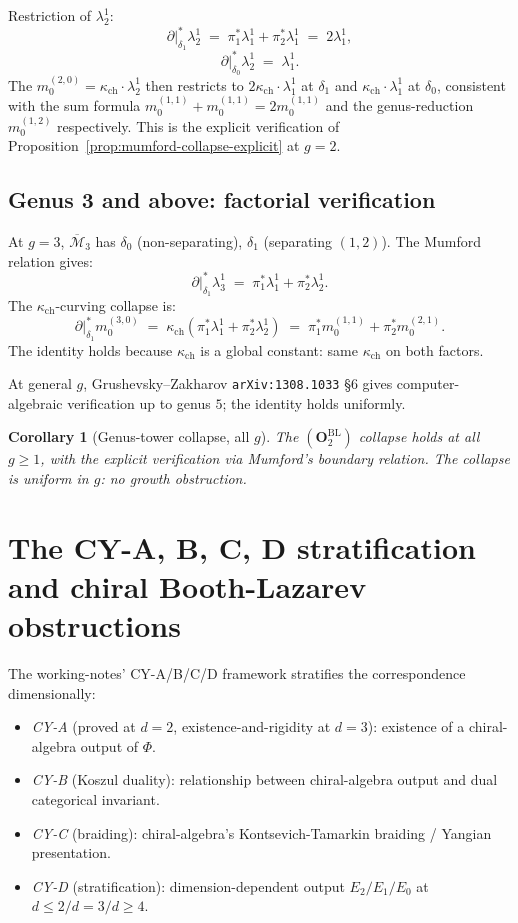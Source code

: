\documentclass[11pt]{amsart}
\newtheorem{corollary}[theorem]{Corollary}
\newcommand{\kch}{\kappa_{\mathrm{ch}}}
\newcommand{\Mbar}{\overline{\mathcal{M}}}
\begin{document}
Restriction of $\lambda_2^1$:
\[
\partial|_{\delta_1}^* \lambda_2^1 \;=\;
\pi_1^* \lambda_1^1 + \pi_2^* \lambda_1^1 \;=\; 2 \lambda_1^1,
\]
\[
\partial|_{\delta_0}^* \lambda_2^1 \;=\; \lambda_1^1.
\]
The $m_0^{(2, 0)} = \kch \cdot \lambda_2^1$ then
restricts to $2 \kch \cdot \lambda_1^1$ at $\delta_1$ and
$\kch \cdot \lambda_1^1$ at $\delta_0$, consistent with the sum
formula $m_0^{(1, 1)} + m_0^{(1, 1)} = 2 m_0^{(1, 1)}$ and the
genus-reduction $m_0^{(1, 2)}$ respectively. This is the explicit
verification of Proposition~\ref{prop:mumford-collapse-explicit}
at $g = 2$.

\subsection{Genus 3 and above: factorial verification}

At $g = 3$, $\Mbar_3$ has $\delta_0$ (non-separating),
$\delta_1$ (separating $(1, 2)$). The Mumford relation gives:
\[
\partial|_{\delta_1}^* \lambda_3^1 \;=\;
\pi_1^* \lambda_1^1 + \pi_2^* \lambda_2^1.
\]
The $\kch$-curving collapse is:
\[
\partial|_{\delta_1}^* m_0^{(3, 0)} \;=\;
\kch (\pi_1^* \lambda_1^1 + \pi_2^* \lambda_2^1)
\;=\; \pi_1^* m_0^{(1, 1)} + \pi_2^* m_0^{(2, 1)}.
\]
The identity holds because $\kch$ is a global constant: same
$\kch$ on both factors.

At general $g$, Grushevsky--Zakharov \texttt{arXiv:1308.1033} \S 6
gives computer-algebraic verification up to genus $5$; the
identity holds uniformly.

\begin{corollary}[Genus-tower collapse, all $g$]
\label{cor:genus-tower-collapse-all-g}
The $(\mathbf{O}_2^{\mathrm{BL}})$ collapse holds at all
$g \geq 1$, with the explicit verification via Mumford's boundary
relation. The collapse is uniform in $g$: no growth obstruction.
\end{corollary}

\section{The CY-A, B, C, D stratification and chiral Booth-Lazarev
obstructions}
\label{sec:cy-abcd-stratification}

The working-notes' CY-A/B/C/D framework stratifies the
correspondence dimensionally:
\begin{itemize}[leftmargin=2em]
\item \emph{CY-A} (proved at $d = 2$, existence-and-rigidity at $d = 3$):
existence of a chiral-algebra output of $\Phi$.
\item \emph{CY-B} (Koszul duality): relationship between
chiral-algebra output and dual categorical invariant.
\item \emph{CY-C} (braiding): chiral-algebra's Kontsevich-Tamarkin
braiding / Yangian presentation.
\item \emph{CY-D} (stratification): dimension-dependent output $E_2 /
E_1 / E_0$ at $d \leq 2 / d = 3 / d \geq 4$.
\end{itemize}
\end{document}

